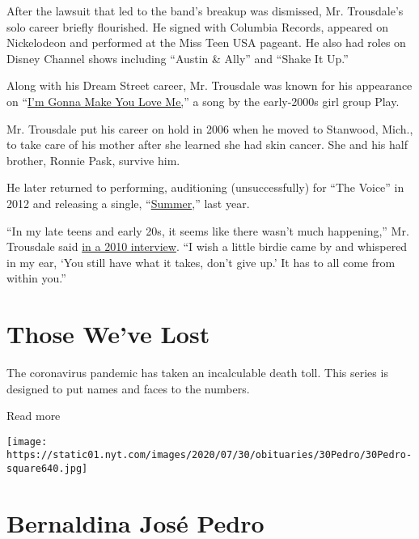 After the lawsuit that led to the band's breakup was dismissed, Mr.
Trousdale's solo career briefly flourished. He signed with Columbia
Records, appeared on Nickelodeon and performed at the Miss Teen USA
pageant. He also had roles on Disney Channel shows including ``Austin \&
Ally'' and ``Shake It Up.''

Along with his Dream Street career, Mr. Trousdale was known for his
appearance on ``\href{https://www.youtube.com/watch?v=s3Y3FMKkfBE}{I'm
Gonna Make You Love Me,}'' a song by the early-2000s girl group Play.

Mr. Trousdale put his career on hold in 2006 when he moved to Stanwood,
Mich., to take care of his mother after she learned she had skin cancer.
She and his half brother, Ronnie Pask, survive him.

He later returned to performing, auditioning (unsuccessfully) for ``The
Voice'' in 2012 and releasing a single,
``\href{https://www.youtube.com/watch?v=FgRXH5RJLO8}{Summer},'' last
year.

``In my late teens and early 20s, it seems like there wasn't much
happening,'' Mr. Trousdale said
\href{https://www.feelingthevibe.com/interviews/11-question-with-chris-trousdale/}{in
a 2010 interview}. ``I wish a little birdie came by and whispered in my
ear, `You still have what it takes, don't give up.' It has to all come
from within you.''

\href{https://www.nytimes.com/interactive/2020/obituaries/people-died-coronavirus-obituaries.html?action=click\&pgtype=Article\&state=default\&region=BELOW_MAIN_CONTENT\&context=covid_obits_promo}{}

\hypertarget{those-weve-lost}{%
\section{Those We've Lost}\label{those-weve-lost}}

The coronavirus pandemic has taken an incalculable death toll. This
series is designed to put names and faces to the numbers.

Read more

\texttt{[image: https://static01.nyt.com/images/2020/07/30/obituaries/30Pedro/30Pedro-square640.jpg]}

\hypertarget{bernaldina-josuxe9-pedro}{%
\section{Bernaldina José Pedro}\label{bernaldina-josuxe9-pedro}}

